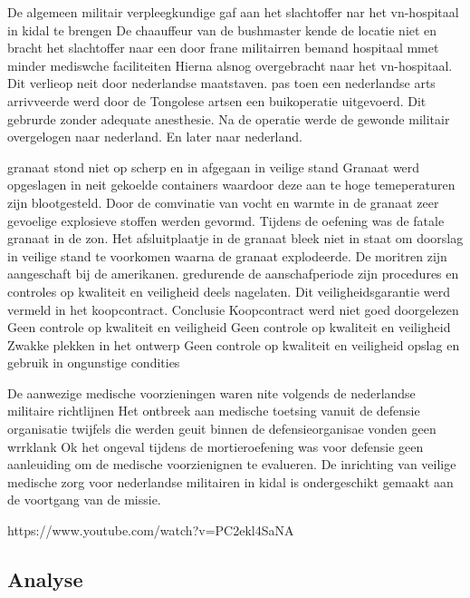 De algemeen militair verpleegkundige gaf aan het slachtoffer nar het vn-hospitaal in kidal te brengen
De chaauffeur van de bushmaster kende de locatie niet  en bracht het slachtoffer naar een door frane militairren bemand hospitaal mmet minder mediswche faciliteiten
Hierna alsnog overgebracht naar het vn-hospitaal.
Dit verlieop  neit door nederlandse maatstaven.
pas toen een nederlandse arts arrivveerde werd door de Tongolese artsen een buikoperatie uitgevoerd.
Dit gebrurde zonder adequate anesthesie.
Na de operatie werde de gewonde militair overgelogen naar nederland. En later naar nederland.


granaat stond niet op scherp en in afgegaan in veilige stand
Granaat werd opgeslagen in neit gekoelde containers waardoor deze aan te hoge temeperaturen zijn blootgesteld.
Door de comvinatie van vocht en warmte in de granaat zeer gevoelige explosieve stoffen werden gevormd.
Tijdens de oefening was de fatale granaat in de zon.
Het afsluitplaatje in de granaat bleek niet in staat om doorslag in veilige stand te voorkomen waarna de granaat explodeerde.
De moritren zijn aangeschaft bij de amerikanen. gredurende de aanschafperiode zijn procedures en controles op kwaliteit en veiligheid deels nagelaten.
Dit veiligheidsgarantie werd vermeld in het koopcontract.
Conclusie
Koopcontract werd niet goed doorgelezen
Geen controle op kwaliteit en veiligheid
Geen controle op kwaliteit en veiligheid
Zwakke plekken in het ontwerp
Geen controle op kwaliteit en veiligheid
opslag en gebruik in ongunstige condities

De aanwezige medische voorzieningen waren nite volgends de nederlandse militaire richtlijnen
Het ontbreek aan medische toetsing vanuit de defensie organisatie
twijfels die werden geuit binnen de defensieorganisae vonden geen wrrklank
Ok het ongeval tijdens de mortieroefening was voor defensie geen aanleuiding om de medische voorzienignen te evalueren.
De inrichting van veilige medische zorg voor nederlandse militairen in kidal is ondergeschikt gemaakt aan de voortgang van de missie.


https://www.youtube.com/watch?v=PC2ekl4SaNA 






 






\subsection{Analyse}


